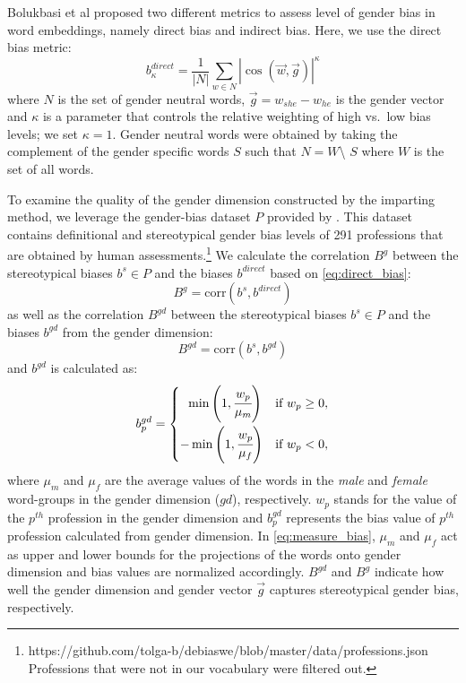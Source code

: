 \documentclass[11pt,a4paper]{article}
\begin{document}
Bolukbasi et al \citep{bolukbasi16debiasing} proposed two different metrics to assess level of gender bias in word embeddings, namely direct bias and indirect bias. Here, we use the direct bias metric:
\begin{equation}
b^{direct}_\kappa = \frac{1}{|N|}\sum_{w\in N}|\cos(\vec{w},\vec{g})|^\kappa
\label{eq:direct_bias}
\end{equation}
where $N$ is the set of gender neutral words,
$\vec{g}= w_{she} - w_{he}$ is the gender vector
and $\kappa$ is a parameter that
controls the relative weighting of high vs.\ low bias
levels; we set $\kappa=1$. Gender
neutral words were obtained by taking the complement of the
gender specific words $S$ such that $N = W$\textbackslash
$S$ where $W$ is the set of all words.

To examine the quality of the gender dimension constructed
by the imparting method, we leverage the gender-bias
dataset $P$ provided by \citet{bolukbasi16debiasing}. This
dataset contains definitional and stereotypical gender bias
levels of 291 professions that are obtained by human
assessments.\footnote{https://github.com/tolga-b/debiaswe/blob/master/data/professions.json\\Professions that were not in our vocabulary were filtered out.} 
We calculate the correlation $B^{g}$ between the stereotypical biases $b^s \in P$  and the biases
$b^{direct}$  based on \eqref{eq:direct_bias}:
\begin{equation}
    B^{g} = \mbox{corr}(b^s,b^{direct})
    \label{eq:bg}
\end{equation}
as well as the correlation $B^{gd}$ between the stereotypical biases $b^s \in P$ and the biases
$b^{gd}$ from the gender dimension:
\begin{equation}
    B^{gd} = \mbox{corr}(b^s,b^{gd}) \label{eq:bgd}
\end{equation}
and $b^{gd}$ is calculated as:
\begin{align}
     b^{gd}_p = 
     \begin{cases}
		~~\min \left( 1, \cfrac{w_{p}}{\mu_m} \right) & \text{if } w_{p} \geq 0, \vspace{0.1cm} \\ 
		-\min \left( 1, \cfrac{w_{p}}{\mu_f} \right) & \text{if } w_{p} < 0,
	\end{cases}
	\label{eq:measure_bias}
\end{align}
where $\mu_m$ and $\mu_f$ are the average values of the
words in the \textit{male} and \textit{female} word-groups
in the gender dimension ($gd$), respectively. $w_p$ stands
for the value of the $p^{th}$ profession in the gender
dimension and $b^{gd}_p$ represents the bias value of
$p^{th}$ profession calculated from gender
dimension. In \eqref{eq:measure_bias}, $\mu_m$ and $\mu_f$ act as upper and lower bounds for the projections of the words onto gender dimension and bias values are normalized accordingly. $B^{gd}$ and $B^g$ indicate how well the gender dimension and gender vector $\vec{g}$
captures stereotypical gender bias, respectively.
\end{document}
